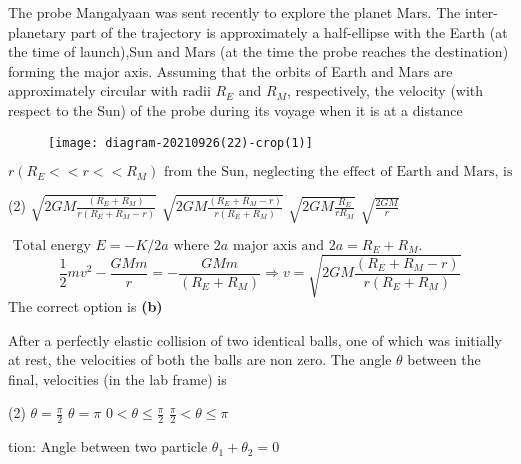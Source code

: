 \begin{enumerate}
\begin{answer}
\end{answer}
\begin{minipage}{\textwidth}
	\item The probe Mangalyaan was sent recently to explore the planet Mars. The inter-planetary part of the trajectory is approximately a half-ellipse with the Earth (at the time of launch),Sun and Mars (at the time the probe reaches the destination) forming the major axis. Assuming that the orbits of Earth and Mars are approximately circular with radii $R_{E}$ and $R_{M}$, respectively, the velocity (with respect to the Sun) of the probe during its voyage when it is at a distance
		\begin{figure}[H]
		\centering
		\texttt{[image: diagram-20210926(22)-crop(1)]}
	\end{figure}
	 $r\left(R_{E}<<r<<R_{M}\right) \text { from the Sun, neglecting the effect of Earth and Mars, is }$
\end{minipage}
\begin{tasks}(2)
	\task[\textbf{A.}] $\sqrt{2 G M \frac{\left(R_{E}+R_{M}\right)}{r\left(R_{E}+R_{M}-r\right)}}$
	\task[\textbf{B.}]$\sqrt{2 G M \frac{\left(R_{E}+R_{M}-r\right)}{r\left(R_{E}+R_{M}\right)}}$
	\task[\textbf{C.}]$\sqrt{2 G M \frac{R_{E}}{r R_{M}}}$
	\task[\textbf{D.}]$\sqrt{\frac{2 G M}{r}}$
\end{tasks}
\begin{answer}
	$\text { Total energy } E=-K / 2 a \text { where } 2 a \text { major axis and } 2 a=R_{E}+R_{M} \text {. }$
	$$\frac{1}{2} m v^{2}-\frac{G M m}{r}=-\frac{G M m}{\left(R_{E}+R_{M}\right)} \Rightarrow v=\sqrt{2 G M \frac{\left(R_{E}+R_{M}-r\right)}{r\left(R_{E}+R_{M}\right)}}$$
	The correct option is \textbf{(b)}
\end{answer}
\begin{minipage}{\textwidth}
	\item After a perfectly elastic collision of two identical balls, one of which was initially at rest, the velocities of both the balls are non zero. The angle $\theta$ between the final, velocities (in the lab frame) is
\end{minipage}
\begin{tasks}(2)
	\task[\textbf{A.}] $\theta=\frac{\pi}{2}$
	\task[\textbf{B.}]$\theta=\pi$
	\task[\textbf{C.}]$0<\theta \leq \frac{\pi}{2}$
	\task[\textbf{D.}] $\frac{\pi}{2}<\theta \leq \pi$
\end{tasks}
\begin{answer}
tion: Angle between two particle $\theta_{1}+\theta_{2}=0$

\end{answer}
\end{enumerate}
